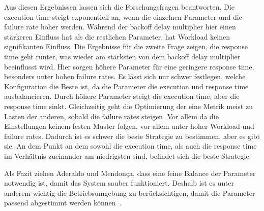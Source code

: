 Aus diesen Ergebnissen lassen sich die Forschungsfragen beantworten.
Die execution time steigt exponentiell an, wenn die einzelnen Parameter und die failure rate höher werden.
Während der backoff delay multiplier hier einen stärkeren Einfluss hat als die restlichen Parameter, hat Workload
keinen signifikanten Einfluss.
Die Ergebnisse für die zweite Frage zeigen, die response time geht runter, was wieder am stärksten von dem backoff
delay multiplier beeinflusst wird.
Hier sorgen höhere Parameter für eine geringere response time, besonders unter hohen failure rates.
Es lässt sich nur schwer festlegen, welche Konfiguration die Beste ist, da die Parameter die execution und response
time ausbalancieren.
Durch höhere Parameter steigt die execution time, aber die response time sinkt.
Gleichzeitig geht die Optimierung der eine Metrik meist zu Lasten der anderen, sobald die failure rates steigen.
Vor allem da die Einstellungen keinem festen Muster folgen, vor allem unter hoher Workload und failure rates.
Dadurch ist es schwer die beste Strategie zu bestimmen, aber es gibt sie.
An dem Punkt an dem sowohl die execution time, als auch die response time im Verhältnis zueinander am niedrigsten
sind, befindet sich die beste Strategie.

Als Fazit ziehen Aderaldo und Mendonça, dass eine feine Balance der Parameter notwendig ist, damit das System
sauber funktioniert.
Deshalb ist es unter anderem wichtig die Betriebsumgebung zu berücksichtigen, damit die Parameter passend abgestimmt
werden können~\cite{Aderaldo2023}.
